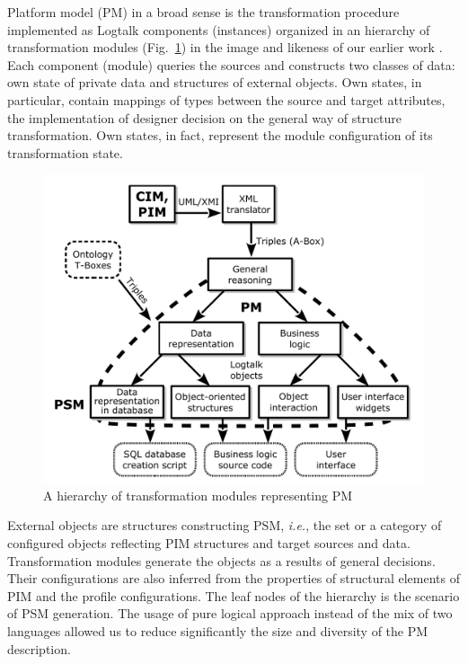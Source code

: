 \documentclass[runningheads]{llncs}
\begin{document}
Platform model (PM) in a broad sense is the transformation procedure implemented as Logtalk components (instances) organized in an hierarchy of transformation modules (Fig.~\ref{fig:modules}) in the image and likeness of our earlier work \cite{tereh1}.  Each component (module) queries the sources and constructs two classes of data: own state of private data and structures of external objects.  Own states, in particular, contain mappings of types between the source and target attributes, the implementation of designer decision on the general way of structure transformation.  Own states, in fact, represent the module configuration of its transformation state.

\begin{figure}[t]
  \centering
  \includegraphics[width=1\linewidth]{architect_tree_pres-en-wo-OCL.pdf}
  \caption{A hierarchy of transformation modules representing PM}
  \label{fig:modules}
\end{figure}

External objects are structures constructing PSM, \emph{i.e.}, the set or a category of configured objects reflecting PIM structures and target sources and data.  Transformation modules generate the objects as a results of general decisions.  Their configurations are also inferred from the properties of structural elements of PIM and the profile configurations.  The leaf nodes of the hierarchy is the scenario of PSM generation.  The usage of pure logical approach instead of the mix of two languages allowed us to reduce significantly the size and diversity of the PM description.
\end{document}
